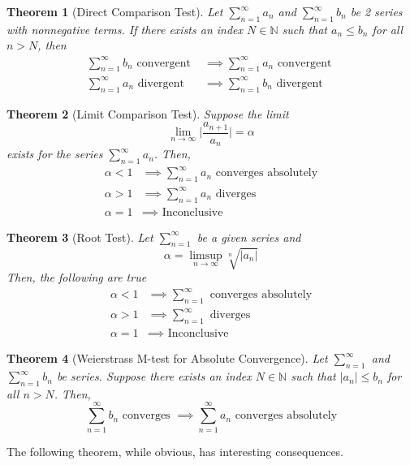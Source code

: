 \documentclass{article}
\newtheorem{theorem}{Theorem}[section]
\theoremstyle{remark}
\theoremstyle{definition}
\begin{document}
\begin{theorem}[Direct Comparison Test]
Let $\sum_{n=1}^\infty a_n$ and $\sum_{n=1}^\infty b_n$ be 2 series with nonnegative terms. If there exists an index $N \in \mathbb{N}$ such that $a_n \leq b_n$ for all $n >N$, then 
\begin{align*}
    \sum_{n=1}^\infty b_n \text{ convergent } & \implies \sum_{n=1}^\infty a_n \text{ convergent } \\
    \sum_{n=1}^\infty a_n \text{ divergent } & \implies \sum_{n=1}^\infty b_n \text{ divergent }
\end{align*}
\end{theorem}

\begin{theorem}[Limit Comparison Test]
Suppose the limit 
\[\lim_{n\rightarrow \infty} \bigg| \frac{a_{n+1}}{a_n} \bigg| = \alpha\]
exists for the series $\sum_{n=1}^\infty a_n$. Then, 
\begin{align*}
    \alpha < 1 & \implies \sum_{n=1}^\infty a_n \text{ converges absolutely} \\
    \alpha > 1 & \implies \sum_{n=1}^\infty a_n \text{ diverges} \\
    \alpha = 1 & \implies \text{ Inconclusive}
\end{align*}
\end{theorem}

\begin{theorem}[Root Test]
Let $\sum_{n=1}^\infty$ be a given series and 
\[\alpha = \limsup_{n\rightarrow \infty} \sqrt[n]{|a_n|}\]
Then, the following are true
\begin{align*}
    \alpha < 1 & \implies \sum_{n=1}^\infty \text{ converges absolutely} \\
    \alpha > 1 & \implies \sum_{n=1}^\infty \text{ diverges} \\
    \alpha = 1 & \implies \text{ Inconclusive} 
\end{align*}
\end{theorem}

\begin{theorem}[Weierstrass M-test for Absolute Convergence]
Let $\sum_{n=1}^\infty$ and $\sum_{n=1}^\infty b_n$ be series. Suppose there exists an index $N \in \mathbb{N}$ such that $|a_n| \leq b_n$ for all $n>N$. Then, 
\[\sum_{n=1}^\infty b_n \text{ converges } \implies \sum_{n=1}^\infty a_n \text{ converges absolutely}\]
\end{theorem}

The following theorem, while obvious, has interesting consequences. 
\end{document}
